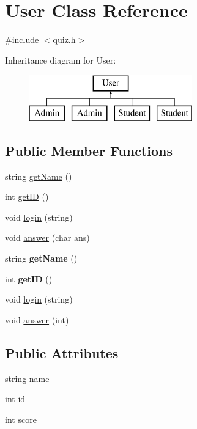 \hypertarget{class_user}{}\section{User Class Reference}
\label{class_user}


{\ttfamily \#include $<$quiz.\+h$>$}

Inheritance diagram for User\+:\begin{figure}[H]
\begin{center}
\leavevmode
\includegraphics[height=2.000000cm]{class_user}
\end{center}
\end{figure}
\subsection*{Public Member Functions}
\begin{DoxyCompactItemize}
\item 
string \hyperlink{class_user_adb316ac38d5f62a967686e7b736a0469}{get\+Name} ()
\item 
int \hyperlink{class_user_adce159ebd006321c4bfc869998064e7f}{get\+I\+D} ()
\item 
void \hyperlink{class_user_a7413d6e3ca3a5157beab559812a25a14}{login} (string)
\item 
void \hyperlink{class_user_a27632c5bd5c4cfc0212c0d81d6473c47}{answer} (char ans)
\item 
\hypertarget{class_user_adb316ac38d5f62a967686e7b736a0469}{}string {\bfseries get\+Name} ()\label{class_user_adb316ac38d5f62a967686e7b736a0469}

\item 
\hypertarget{class_user_adce159ebd006321c4bfc869998064e7f}{}int {\bfseries get\+I\+D} ()\label{class_user_adce159ebd006321c4bfc869998064e7f}

\item 
void \hyperlink{class_user_a7413d6e3ca3a5157beab559812a25a14}{login} (string)
\item 
void \hyperlink{class_user_a64a7433869a4ad67cf381a6d71b2f2d8}{answer} (int)
\end{DoxyCompactItemize}
\subsection*{Public Attributes}
\begin{DoxyCompactItemize}
\item 
string \hyperlink{class_user_a643f85779a4693855c171c396f49e515}{name}
\item 
int \hyperlink{class_user_aa7e6e39b43020bbe9c3a196b3689b0f7}{id}
\item 
int \hyperlink{class_user_a2abd31b5758f4a62d50426846cb51e6d}{score}
\end{DoxyCompactItemize}


